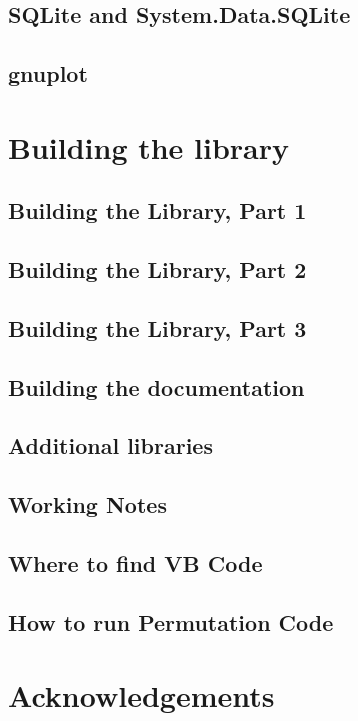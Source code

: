 \documentclass[12pt,a4paper,openany]{book}
\begin{document}
\section{SQLite and System.Data.SQLite}

\section{gnuplot}

\chapter{Building the library}

\section{Building the Library, Part 1}

\section{Building the Library, Part 2}

\section{Building the Library, Part 3}

\section{Building the documentation}

\section{Additional libraries}

\section{Working Notes}

\section{Where to find VB Code}

\section{How to run Permutation Code}

\chapter{Acknowledgements}
\end{document}
